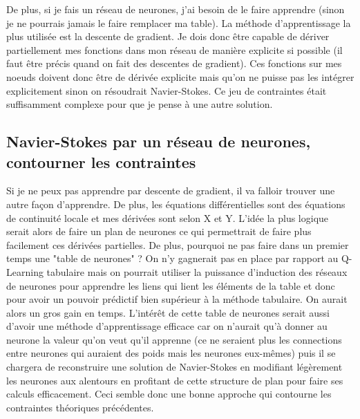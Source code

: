 \documentclass[10pt]{article}
\begin{document}
De plus, si je fais un réseau de neurones, j'ai besoin de le faire apprendre (sinon je ne pourrais jamais le faire remplacer ma table). La méthode d'apprentissage la plus utilisée est la descente de gradient. Je dois donc être capable de dériver partiellement mes fonctions dans mon réseau de manière explicite si possible (il faut être précis quand on fait des descentes de gradient). Ces fonctions sur mes noeuds doivent donc être de dérivée explicite mais qu'on ne puisse pas les intégrer explicitement sinon on résoudrait Navier-Stokes. Ce jeu de contraintes était suffisamment complexe pour que je pense à une autre solution.

\subsection{Navier-Stokes par un réseau de neurones, contourner les contraintes}
Si je ne peux pas apprendre par descente de gradient, il va falloir trouver une autre façon d'apprendre. De plus, les équations différentielles sont des équations de continuité locale et mes dérivées sont selon X et Y. L'idée la plus logique serait alors de faire un plan de neurones ce qui permettrait de faire plus facilement ces dérivées partielles. De plus, pourquoi ne pas faire dans un premier temps une "table de neurones" ? On n'y gagnerait pas en place par rapport au Q-Learning tabulaire mais on pourrait utiliser la puissance d'induction des réseaux de neurones pour apprendre les liens qui lient les éléments de la table et donc pour avoir un pouvoir prédictif bien supérieur à la méthode tabulaire. On aurait alors un gros gain en temps. L'intérêt de cette table de neurones serait aussi d'avoir une méthode d'apprentissage efficace car on n'aurait qu'à donner au neurone la valeur qu'on veut qu'il apprenne (ce ne seraient plus les connections entre neurones qui auraient des poids mais les neurones eux-mêmes) puis il se chargera de reconstruire une solution de Navier-Stokes en modifiant légèrement les neurones aux alentours en profitant de cette structure de plan pour faire ses calculs efficacement. Ceci semble donc une bonne approche qui contourne les contraintes théoriques précédentes.
\end{document}
